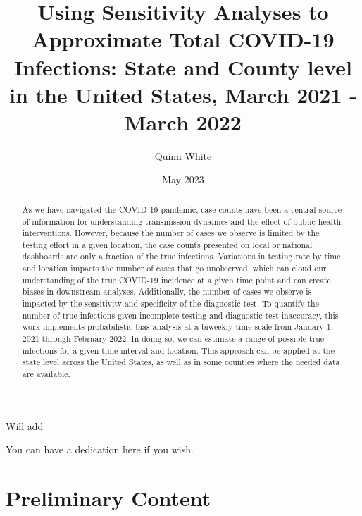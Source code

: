 \documentclass[12pt,twoside]{smiththesis}
\title{Using Sensitivity Analyses to Approximate Total COVID-19 Infections: State and County level in the United States, March 2021 - March 2022}
\author{Quinn White}
\date{May 2023}
\begin{document}
  \maketitle

\frontmatter %
\pagestyle{empty} %
  \begin{acknowledgements}
    Will add
  \end{acknowledgements}

  {
    \hypersetup{linkcolor=black}
    \setcounter{tocdepth}{2}
    \tableofcontents
  }


  \begin{abstract}
    As we have navigated the COVID-19 pandemic, case counts have been a central source of information for understanding transmission dynamics and the effect of public health interventions. However, because the number of cases we observe is limited by the testing effort in a given location, the case counts presented on local or national dashboards are only a fraction of the true infections. Variations in testing rate by time and location impacts the number of cases that go unobserved, which can cloud our understanding of the true COVID-19 incidence at a given time point and can create biases in downstream analyses. Additionally, the number of cases we observe is impacted by the sensitivity and specificity of the diagnostic test. To quantify the number of true infections given incomplete testing and diagnostic test inaccuracy, this work implements probabilistic bias analysis at a biweekly time scale from January 1, 2021 through February 2022. In doing so, we can estimate a range of possible true infections for a given time interval and location. This approach can be applied at the state level across the United States, as well as in some counties where the needed data are available.
  \end{abstract}
  \begin{dedication}
    You can have a dedication here if you wish.
  \end{dedication}
\mainmatter %
\pagestyle{fancyplain} %

\hypertarget{preliminary-content}{%
\chapter*{Preliminary Content}\label{preliminary-content}}
\end{document}

